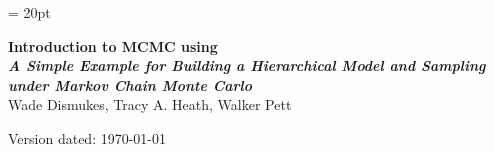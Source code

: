 \documentclass[11pt]{article}
\begin{document}
\renewcommand{\headrulewidth}{0.5pt}
\headsep = 20pt
\lhead{ }

\thispagestyle{plain}
\begin{center}

\textbf{\LARGE Introduction to MCMC using \RevBayes}\\\vspace{2mm}
\textbf{\it{\Large A Simple Example for Building a Hierarchical Model and Sampling under Markov Chain Monte Carlo}}\\\vspace{2mm}
\vspace{1cm}
{\Large Wade Dismukes, Tracy A. Heath, Walker Pett}
\vspace{1cm}
\end{center}

\def \ResourcePath {./}
\def \GlobalResourcePath {../}


Version dated: \today
\end{document}
